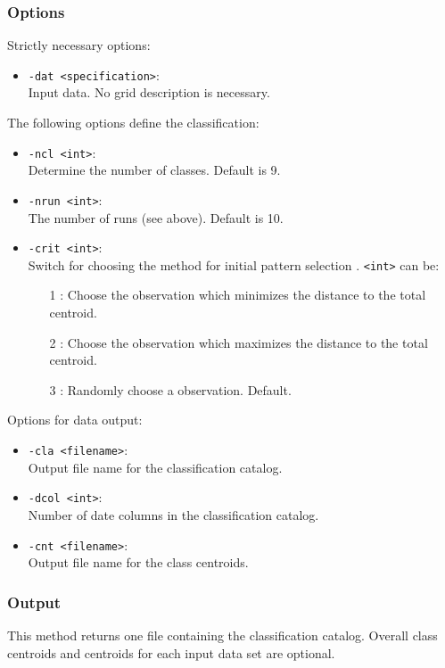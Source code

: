 \documentclass[12pt, oneside, a4paper, headsepline, plainheadsepline]{scrbook}
\begin{document}
\subsubsection*{Options}
Strictly necessary options:
\begin{itemize}
 \item \verb+-dat <specification>+:\\ Input data. No grid description is necessary.
\end{itemize}
The following options define the classification:
\begin{itemize}
 \item \verb+-ncl <int>+:\\ Determine the number of classes. Default is 9.
 \item \verb+-nrun <int>+:\\ The number of runs (see above). Default is 10.
 \item \verb+-crit <int>+:\\ Switch for choosing the method for initial pattern selection . \verb+<int>+ can be:
 \begin{itemize}
  \item[1]: Choose the observation which minimizes the distance to the total centroid.
  \item[2]: Choose the observation which maximizes the distance to the total centroid.
  \item[3]: Randomly choose a observation. Default.
 \end{itemize}
\end{itemize}
Options for data output:
\begin{itemize}
 \item \verb+-cla <filename>+:\\ Output file name for the classification catalog.
 \item \verb+-dcol <int>+:\\ Number of date columns in the classification catalog.
 \item \verb+-cnt <filename>+:\\ Output file name for the class centroids.
\end{itemize}

\subsubsection*{Output}
This method returns one file containing the classification catalog. 
Overall class centroids and centroids for each input data set are optional.
\end{document}

